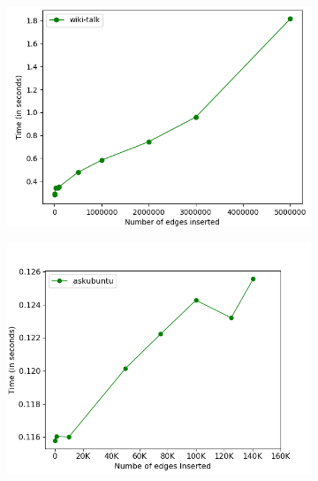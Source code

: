 \documentclass[a4paper]{article}
\begin{document}
\begin{figure}[H]
    \centering
    \begin{subfigure}[b]{0.42\textwidth}
         \centering
         \includegraphics[width=\textwidth]{img/ins/i0.png}
         \caption{}
         \label{fig:insert_trend_1}
    \end{subfigure}
    \hfill
    \begin{subfigure}[b]{0.45\textwidth}
         \centering
         \includegraphics[width=\textwidth]{img/ins/i1.png}
         \caption{}
         \label{fig:insert_trend_2}
    \end{subfigure}
    \hfill
    \begin{subfigure}[b]{0.45\textwidth}
         \centering

\end{subfigure}
\end{figure}
\end{document}
